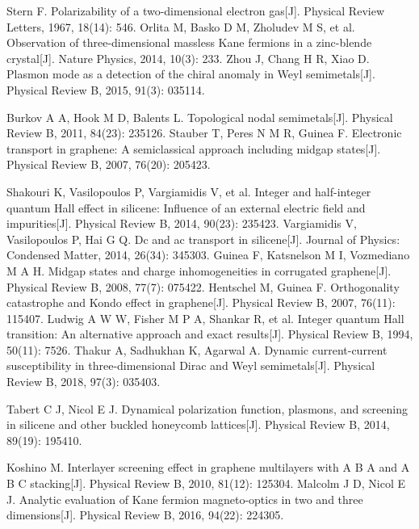 \documentclass[UTF8,a4paper]{article}
\begin{document}
\begin{thebibliography}{99}
Stern F. Polarizability of a two-dimensional electron gas[J]. Physical Review Letters, 1967, 18(14): 546.
Orlita M, Basko D M, Zholudev M S, et al. Observation of three-dimensional massless Kane fermions in a zinc-blende crystal[J]. Nature Physics, 2014, 10(3): 233.
Zhou J, Chang H R, Xiao D. Plasmon mode as a detection of the chiral anomaly in Weyl semimetals[J]. Physical Review B, 2015, 91(3): 035114.

Burkov A A, Hook M D, Balents L. Topological nodal semimetals[J]. Physical Review B, 2011, 84(23): 235126.
Stauber T, Peres N M R, Guinea F. Electronic transport in graphene: A semiclassical approach including midgap states[J]. Physical Review B, 2007, 76(20): 205423.

Shakouri K, Vasilopoulos P, Vargiamidis V, et al. Integer and half-integer quantum Hall effect in silicene: Influence of an external electric field and impurities[J]. Physical Review B, 2014, 90(23): 235423.
Vargiamidis V, Vasilopoulos P, Hai G Q. Dc and ac transport in silicene[J]. Journal of Physics: Condensed Matter, 2014, 26(34): 345303.
Guinea F, Katsnelson M I, Vozmediano M A H. Midgap states and charge inhomogeneities in corrugated graphene[J]. Physical Review B, 2008, 77(7): 075422.
Hentschel M, Guinea F. Orthogonality catastrophe and Kondo effect in graphene[J]. Physical Review B, 2007, 76(11): 115407.
Ludwig A W W, Fisher M P A, Shankar R, et al. Integer quantum Hall transition: An alternative approach and exact results[J]. Physical Review B, 1994, 50(11): 7526.
Thakur A, Sadhukhan K, Agarwal A. Dynamic current-current susceptibility in three-dimensional Dirac and Weyl semimetals[J]. Physical Review B, 2018, 97(3): 035403.


Tabert C J, Nicol E J. Dynamical polarization function, plasmons, and screening in silicene and other buckled honeycomb lattices[J]. Physical Review B, 2014, 89(19): 195410.

Koshino M. Interlayer screening effect in graphene multilayers with A B A and A B C stacking[J]. Physical Review B, 2010, 81(12): 125304.
Malcolm J D, Nicol E J. Analytic evaluation of Kane fermion magneto-optics in two and three dimensions[J]. Physical Review B, 2016, 94(22): 224305.


\end{thebibliography}
\end{document}
